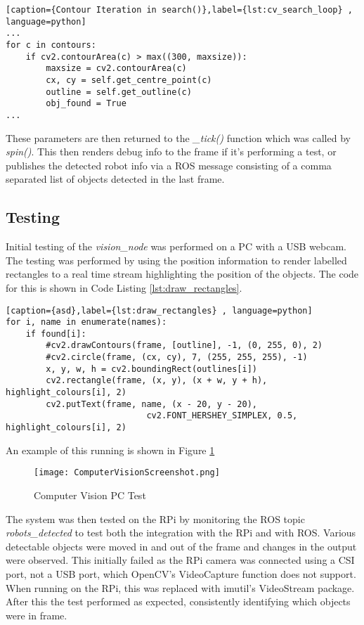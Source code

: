 \begin{lstlisting}[caption={Contour Iteration in search()},label={lst:cv_search_loop} , language=python]
...
for c in contours:
    if cv2.contourArea(c) > max((300, maxsize)):  
        maxsize = cv2.contourArea(c)
        cx, cy = self.get_centre_point(c)
        outline = self.get_outline(c)
        obj_found = True
...
\end{lstlisting}

These parameters are then returned to the \textit{\_tick()} function which was called by \textit{spin()}. This then renders debug info to the frame if it's performing a test, or publishes the detected robot info via a ROS message consisting of a comma separated list of objects detected in the last frame. 

\subsection{Testing}\label{soft/cv/test}
Initial testing of the \textit{vision\_node} was performed on a PC with a USB webcam. The testing was performed by using the position information to render labelled rectangles to a real time stream highlighting the position of the objects. The code for this is shown in Code Listing \ref{lst:draw_rectangles}. 

\begin{lstlisting}[caption={asd},label={lst:draw_rectangles} , language=python]
for i, name in enumerate(names):
    if found[i]:
        #cv2.drawContours(frame, [outline], -1, (0, 255, 0), 2)
        #cv2.circle(frame, (cx, cy), 7, (255, 255, 255), -1)
        x, y, w, h = cv2.boundingRect(outlines[i])
        cv2.rectangle(frame, (x, y), (x + w, y + h), highlight_colours[i], 2)
        cv2.putText(frame, name, (x - 20, y - 20),
                            cv2.FONT_HERSHEY_SIMPLEX, 0.5, highlight_colours[i], 2)
\end{lstlisting}

An example of this running is shown in Figure \ref{fig:cv_screenshot}

\begin{figure}[!ht]
	\centering
	\texttt{[image: ComputerVisionScreenshot.png]}
	\caption{Computer Vision PC Test}\label{fig:cv_screenshot}

\end{figure}

The system was then tested on the RPi by monitoring the ROS topic \textit{robots\_detected} to test both the integration with the RPi and with ROS. Various detectable objects were moved in and out of the frame and changes in the output were observed. This initially failed as the RPi camera was connected using a CSI port, not a USB port, which OpenCV's VideoCapture function does not support. When running on the RPi, this was replaced with imutil's VideoStream package. After this the test performed as expected, consistently identifying which objects were in frame.  

